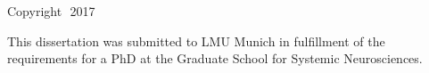 
\thispagestyle{empty}

\hfill


\begin{center}
\myName \\
\smallskip
\textit{\myTitle}\\
\smallskip
Copyright\,\textcopyright\ 2017
\end{center}

\medskip

\noindent
This dissertation was submitted to LMU Munich in fulfillment of the requirements for a PhD at the Graduate School for Systemic Neurosciences.

\bigskip

\noindent
\textsf{}

\noindent
{}\,\mail{\myEmail}